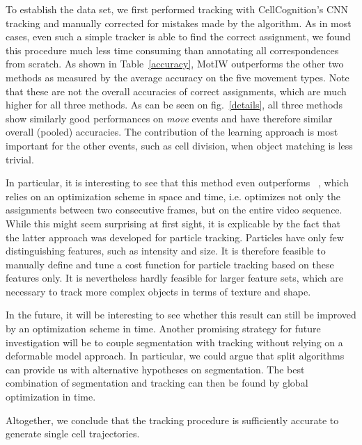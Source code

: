To establish the data set, we first performed tracking with
CellCognition's CNN tracking and manually corrected for mistakes made
by the algorithm. As in most cases, even such a simple tracker is able
to find the correct assignment, we found this procedure much less time
consuming than annotating all correspondences from scratch. 
As shown in Table~\ref{accuracy}, MotIW outperforms the other two
methods as measured by the average accuracy on the five movement
types. Note that these are not the overall accuracies of correct
assignments, which are much higher for all three methods. 
As can be seen on fig.~\ref{details}, all three methods show similarly good
performances on \textit{move} events and have therefore similar
overall (pooled) accuracies. The contribution of the learning approach
is most important for the other events, such as cell division, when
object matching is less trivial. 

In particular, it is interesting to see that this method even outperforms
~\cite{jaqaman}, which relies on an optimization scheme in space and
time, i.e. optimizes not only the assignments between two consecutive
frames, but on the entire video sequence. While this might seem
surprising at first sight, it is explicable by the fact that the
latter approach was developed for particle tracking. Particles have only few distinguishing features, such as
intensity and size. It is therefore feasible to manually define and tune a cost function for particle tracking  based on these features only. It is nevertheless hardly feasible for larger feature sets, which are necessary to track more complex objects in terms of texture and shape. %

In the future, it will be interesting to see whether this result can
still be improved by an optimization scheme in time. Another promising
strategy for future investigation will be to couple segmentation
with tracking without relying on a deformable model approach. In
particular, we could argue that split algorithms can provide us with
alternative hypotheses on segmentation. The best combination of
segmentation and tracking can then be found by global optimization in
time. 

Altogether, we conclude that the tracking procedure is sufficiently
accurate to generate single cell trajectories. 



